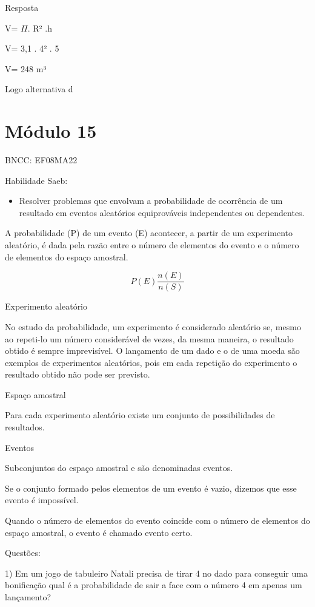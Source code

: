 Resposta

V= \(\Pi\). R² .h

V= 3,1 . 4² . 5

V= 248 m³

Logo alternativa d

\hypertarget{muxf3dulo-15}{%
\section{Módulo 15}\label{muxf3dulo-15}}

BNCC: EF08MA22

Habilidade Saeb:

\begin{itemize}
\tightlist
\item
  Resolver problemas que envolvam a probabilidade de ocorrência de um
  resultado em eventos aleatórios equiprováveis independentes ou
  dependentes.
\end{itemize}

A probabilidade (P) de um evento (E) acontecer, a partir de um
experimento aleatório, é dada pela razão entre o número de elementos do
evento e o número de elementos do espaço amostral.

\[P(E)\frac{n(E)}{n(S)}\]

Experimento aleatório

No estudo da probabilidade, um experimento é considerado aleatório se,
mesmo ao repeti-lo um número considerável de vezes, da mesma maneira, o
resultado obtido é sempre imprevisível. O lançamento de um dado e o de
uma moeda são exemplos de experimentos aleatórios, pois em cada
repetição do experimento o resultado obtido não pode ser previsto.

Espaço amostral

Para cada experimento aleatório existe um conjunto de possibilidades de
resultados.

Eventos

Subconjuntos do espaço amostral e são denominadas eventos.

Se o conjunto formado pelos elementos de um evento é vazio, dizemos que
esse evento é impossível.

Quando o número de elementos do evento coincide com o número de
elementos do espaço amostral, o evento é chamado evento certo.

Questões:

1) Em um jogo de tabuleiro Natali precisa de tirar 4 no dado para
conseguir uma bonificação qual é a probabilidade de sair a face com o
número 4 em apenas um lançamento?

